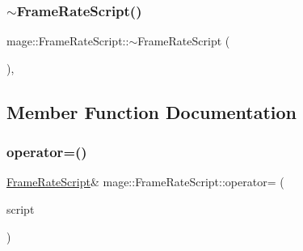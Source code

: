 \hypertarget{classmage_1_1_frame_rate_script_a0863d9339500e10d988dd574448c28f3}{}\label{classmage_1_1_frame_rate_script_a0863d9339500e10d988dd574448c28f3} 
\subsubsection{\texorpdfstring{$\sim$\+Frame\+Rate\+Script()}{~FrameRateScript()}}
{\footnotesize\ttfamily mage\+::\+Frame\+Rate\+Script\+::$\sim$\+Frame\+Rate\+Script (\begin{DoxyParamCaption}{ }\end{DoxyParamCaption})\hspace{0.3cm}{\ttfamily [virtual]}, {\ttfamily [default]}}



\subsection{Member Function Documentation}
\hypertarget{classmage_1_1_frame_rate_script_a2077ec2facadcde117a20d18e2f0e9b7}{}\label{classmage_1_1_frame_rate_script_a2077ec2facadcde117a20d18e2f0e9b7} 
\subsubsection{\texorpdfstring{operator=()}{operator=()}\hspace{0.1cm}{\footnotesize\ttfamily [1/2]}}
{\footnotesize\ttfamily \hyperlink{classmage_1_1_frame_rate_script}{Frame\+Rate\+Script}\& mage\+::\+Frame\+Rate\+Script\+::operator= (\begin{DoxyParamCaption}\item[{const \hyperlink{classmage_1_1_frame_rate_script}{Frame\+Rate\+Script} \&}]{script }\end{DoxyParamCaption})\hspace{0.3cm}{\ttfamily [delete]}}

\hypertarget{classmage_1_1_frame_rate_script_a828664f89350ac0da2da3da26c05a6f0}{}\label{classmage_1_1_frame_rate_script_a828664f89350ac0da2da3da26c05a6f0} 
